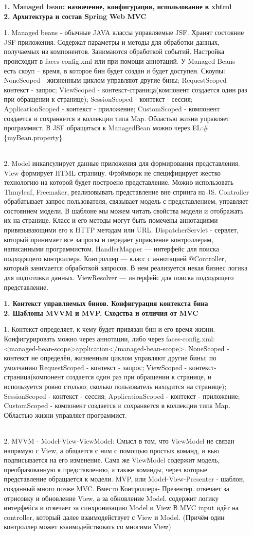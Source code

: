 \documentclass{article}
\newcommand{\bil}[4]{%
    \begin{minipage}{.3\textwidth}
        \textbf{1. #1} \\
        \textbf{2. #2}

        1. #3
        \\
        2. #4
    \end{minipage}
}
\begin{document}
\bil{Managed bean: назначение, конфигурация, использование в xhtml}{Архитектура и состав Spring Web MVC}{
    Managed beans - обычные JAVA классы управляемые JSF.
    Хранят состояние JSF-приложения. 
    Содержат параметры и методы для обработки данных, получаемых из компонентов. 
    Занимаются обработкой событий. Настройка происходит в faces-config.xml или при помощи аннотаций.
	У Managed Beans есть скоуп – время, в которое бин будет создан и будет доступен. Скоупы:
NoneScoped - жизненным циклом управляют другие бины;
RequestScoped - контекст - запрос;
ViewScoped - контекст-страница(компонент создается один раз при обращении к странице);
SessionScoped - контекст - сессия;
ApplicationScoped - контекст - приложение;
CustomScoped - компонент создается и сохраняется в коллекции типа Map. Областью жизни управляет программист.
В JSF обращаться к ManagedBean можно через EL:\# \{myBean.property\}
}{
    Model инкапсулирует данные приложения для формирования представления.
    View формирует HTML страницу.
    Фрэймворк не специфицирует жестко технологию на которой будет построено представление. 
    Можно использовать Thmyleaf, Freemaker, реализовывать представление вне спринга на JS.
    Controller обрабатывает запрос пользователя, связывает модель с представлением, управляет состоянием модели.
    В шаблоне мы можем читать свойства модели и отображать их на странице.
    Класс и его методы могут быть помечены аннотациями привязывающими его к HTTP методам или URL.
    DispatcherServlet - сервлет, который принимает все запросы и передает управление контроллерам, написанными программистом.
    HandlerMapper — интерфейс для поиска подходящего контроллера.
    Контроллер — класс с аннотацией @Controller, который занимается обработкой запросов. В нем реализуется некая бизнес логика для подготовки данных.
    ViewResolver — интерфейс для поиска подходящего представление.    
}
\hfill
\bil{Контекст управляемых бинов. Конфигурация контекста бина}{Шаблоны MVVM и MVP. Сходства и отличия от MVC }{
    Контекст определяет, к чему будет привязан бин и его время жизни.
    Конфигурировать можно через аннотации, либо через faces-config.xml: <managed-bean-scope>application</managed-bean-scope>.
    NoneScoped - контекст не определён, жизненным циклом управляют другие бины; по умолчанию
    RequestScoped - контекст - запрос;
    ViewScoped - контекст-страница(компонент создается один раз при обращении к странице, и используется ровно столько, сколько пользователь находится на странице);
    SessionScoped - контекст - сессия;
    ApplicationScoped - контекст - приложение;
    CustomScoped - компонент создается и сохраняется в коллекции типа Map. Областью жизни управляет программист.
}{
    MVVM - Model-View-ViewModel: Смысл в том, что ViewModel не связан напрямую с View, а общается с ним с помощью простых команд, и вью подписывается на его изменение. Сама же ViewModel содержит модель, преобразованную к представлению, а также команды, через которые представление обращается к модели.
    MVP, или Model-View-Presenter - шаблон, созданный много позже MVC. Вместо Контроллера- Презентер. отвечает за отрисовку и обновление View, а за обновление Model. содержит логику интерфейса и отвечает за синхронизацию Model и View
    В MVC  input идёт на controller, который далее взаимодействует с View и Model. (Причём один контроллер может взаимодействовать со многими View)
}
\end{document}
